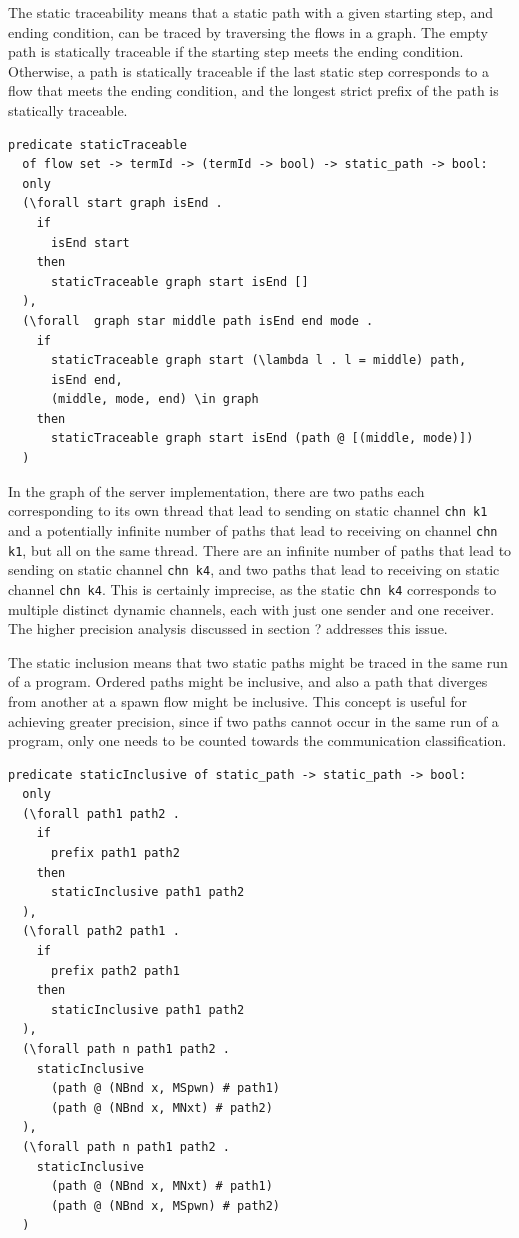 \documentclass[10pt]{article}
\begin{document}
The static traceability means that a static path with a given starting step, and ending
condition, can be traced by traversing the flows in a graph.
The empty path is statically traceable if the starting step meets the ending condition.
Otherwise, a path is statically traceable if the last static step corresponds to a flow
that meets the ending condition, and the longest strict prefix of the path is statically
traceable.  

\begin{lstlisting}[language=logic, mathescape]
  predicate staticTraceable
  of flow set -> termId -> (termId -> bool) -> static_path -> bool:
  only
  (\forall start graph isEnd .
    if
      isEnd start
    then
      staticTraceable graph start isEnd []
  ),
  (\forall  graph star middle path isEnd end mode .
    if 
      staticTraceable graph start (\lambda l . l = middle) path, 
      isEnd end, 
      (middle, mode, end) \in graph 
    then
      staticTraceable graph start isEnd (path @ [(middle, mode)])
  )
\end{lstlisting}

In the graph of the server implementation, there are two paths each corresponding to its
own thread that lead
to sending on
static channel \lstinline[language=sugar_lang]{chn k1} and a potentially infinite number of
paths that lead to receiving on
channel \lstinline[language=sugar_lang]{chn k1}, but all on the same thread.
There are an infinite number of paths that lead
to sending on static channel \lstinline[language=sugar_lang]{chn k4}, and two paths
that lead to receiving on static channel
\lstinline[language=sugar_lang]{chn k4}. This is certainly imprecise,
as the static \lstinline[language=sugar_lang]{chn k4} corresponds to
multiple distinct dynamic channels, each with just one sender and one receiver.  The higher
precision analysis discussed in section ? addresses this issue.


The static inclusion means that two static paths might be traced in
the same run of a program. Ordered paths might be inclusive, and also a path that diverges
from another at a spawn flow might be inclusive. This concept is useful for achieving
greater precision, since if two paths cannot occur in the same run of a program, only one needs
to be counted towards the communication classification. 

\begin{lstlisting}[language=logic, mathescape]
  predicate staticInclusive of static_path -> static_path -> bool:
  only
  (\forall path1 path2 .
    if
      prefix path1 path2
    then
      staticInclusive path1 path2
  ),
  (\forall path2 path1 .
    if
      prefix path2 path1
    then
      staticInclusive path1 path2
  ),
  (\forall path n path1 path2 .
    staticInclusive
      (path @ (NBnd x, MSpwn) # path1)
      (path @ (NBnd x, MNxt) # path2)
  ),
  (\forall path n path1 path2 .
    staticInclusive
      (path @ (NBnd x, MNxt) # path1)
      (path @ (NBnd x, MSpwn) # path2)
  )
\end{lstlisting}
\end{document}

